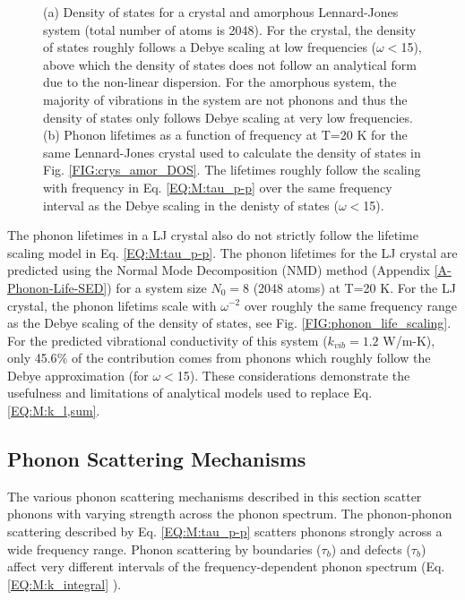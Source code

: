 \documentclass[letterpaper,12pt]{article}
\begin{document}
\begin{figure}[ht]
{\label{FIG:phonon_life_scaling}
}
\label{FIG:crys_dos_life}
\caption{ (a) Density of states for a crystal and amorphous Lennard-Jones system (total number of atoms is 2048). For the crystal, the density of states roughly follows a Debye scaling at low frequencies ($\omega<$15), above which the density of states does not follow an analytical form due to the non-linear dispersion. For the amorphous system, the majority of vibrations in the system are not phonons and thus the density of states only follows Debye scaling at very low frequencies. (b) Phonon lifetimes as a function of frequency at T=20 K for the same Lennard-Jones crystal used to calculate the density of states in Fig. \ref{FIG:crys_amor_DOS}. The lifetimes roughly follow the scaling with frequency in Eq. \eqref{EQ:M:tau_p-p} over the same frequency interval as the Debye scaling in the denisty of states ($\omega<$15).}
\end{figure}
The phonon lifetimes in a LJ crystal also do not strictly follow the lifetime scaling model in Eq$.$ \eqref{EQ:M:tau_p-p}. The phonon lifetimes for the LJ crystal are predicted using the Normal Mode Decomposition (NMD) method (Appendix \ref{A-Phonon-Life-SED}) for a system size $N_0=8$ (2048 atoms) at T=20 K. For the LJ crystal, the phonon lifetims scale with $\omega^{-2}$ over roughly the same frequency range as the Debye scaling of the density of states, see Fig. \eqref{FIG:phonon_life_scaling}.  For the predicted vibrational conductivity of this system ($k_{vib} = 1.2$ W/m-K), only 45.6$\%$ of the contribution comes from phonons which roughly follow the Debye approximation (for $\omega<$15). These considerations demonstrate the usefulness and limitations of analytical models used to replace Eq$.$ \eqref{EQ:M:k_l,sum}.

\subsection{\label{S-Prelim-Phonon-Scattering}Phonon Scattering Mechanisms}

The various phonon scattering mechanisms described in this section scatter phonons with varying strength across the phonon spectrum. The phonon-phonon scattering described by Eq$.$ \eqref{EQ:M:tau_p-p} scatters phonons strongly across a wide frequency range. Phonon scattering by boundaries ($\tau_{b}$) and defects ($\tau_{b}$) affect very different intervals of the frequency-dependent phonon spectrum  (Eq$.$ \eqref{EQ:M:k_integral} ).
\end{document}
